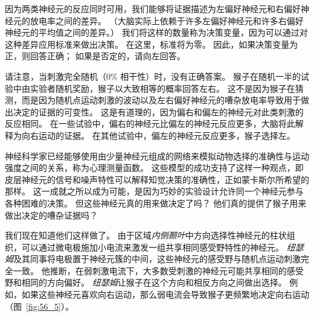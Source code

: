 因为两类神经元的反应同时可用，我们能够将证据描述为左偏好神经元和右偏好神经元的放电率之间的差异。
（大脑实际上依赖于许多左偏好神经元和许多右偏好神经元的平均值之间的差异。）
我们将这样的数量称为决策变量，因为可以通过对这种差异应用标准来做出决策。
在这里，标准将为零。
因此，如果决策变量为正，则回答正确；
如果是否定的，请向左回答。


请注意，当刺激完全随机（0\% 相干性）时，没有正确答案。
猴子在随机一半的试验中由实验者随机奖励，猴子以大致相等的概率回答左右。
这不是因为猴子在猜测，而是因为随机点运动刺激的波动以及左右偏好神经元的嘈杂放电率导致用于做出决定的证据的可变性。
这是有道理的，因为偏右和偏左的神经元对此类刺激的反应相同。
在一些试验中，偏右的神经元比偏左的神经元反应更多，大脑将此解释为向右运动的证据。
在其他试验中，偏左的神经元反应更多，猴子选择左。


神经科学家已经能够使用由少量神经元组成的网络来模拟动物选择的准确性与运动强度之间的关系，称为心理测量函数。
这些模型的成功支持了这样一种观点，即皮层神经元的信号和噪声特性可以解释知觉决策的准确性，正如蒙卡斯尔所希望的那样。
这一成就之所以成为可能，是因为巧妙的实验设计允许同一个神经元参与各种困难的决策。
但这些神经元真的用来做决定了吗？
他们真的提供了猴子用来做出决定的嘈杂证据吗？


我们现在知道他们这样做了。
由于区域\textit{内侧颞叶}中方向选择性神经元的柱状组织，可以通过微电极施加小电流来激发一组共享相同感受野特性的神经元。
\textit{纽瑟姆}及其同事将电极置于神经元簇的中间，这些神经元的感受野与随机点运动刺激完全一致。
他推断，在弱刺激电流下，大多数受刺激的神经元可能共享相同的感受野和相同的方向偏好。
\textit{纽瑟姆}让猴子在这个方向和相反方向之间做出选择。
例如，如果这些神经元喜欢向右运动，那么弱电流会导致猴子更频繁地决定向右运动（图~\ref{fig:56_5}）。


